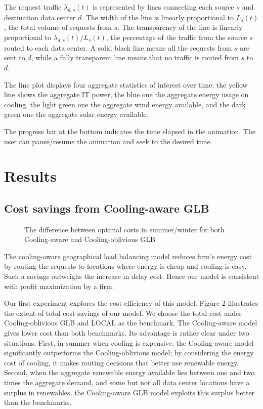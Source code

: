 \documentclass{acm_proc_article-sp}
\begin{document}
The request traffic $\lambda_{d,s}(t)$ is represented by lines connecting each source $s$ and destination data center $d$. The width of the line is linearly proportional to $L_s(t)$, the total volume of requests from $s$. The transparency of the line is linearly proportional to ${\lambda_{d,s}(t)} / {L_s(t)}$, the percentage of the traffic from the source $s$ routed to each data center. A solid black line means all the requests from $s$ are sent to $d$, while a fully transparent line means that no traffic is routed from $s$ to $d$.

The line plot displays four aggregate statistics of interest over time: the yellow line shows the aggregate IT power, the blue one the aggregate energy usage on cooling, the light green one the aggregate wind energy available, and the dark green one the aggregate solar energy available.

The progress bar at the bottom indicates the time elapsed in the animation. The user can pause/resume the animation and seek to the desired time.


\section{Results}
\subsection{Cost savings from Cooling-aware GLB}

\begin{figure}
\centering
{}
\caption{The difference between optimal costs in summer/winter for both Cooling-aware and Cooling-oblivious GLB}
\end{figure}

The cooling-aware geographical load balancing model reduces firm’s energy cost by routing the requests to locations where energy is cheap and cooling is easy. Such a savings outweighs the increase in delay cost. Hence our model is consistent with profit maximization by a firm.


Our first experiment explores the cost efficiency of this model. Figure 2 illustrates the extent of total cost savings of our model. We choose the total cost under Cooling-oblivious GLB and LOCAL as the benchmark. The Cooling-aware model gives lower cost than both benchmarks. Its advantage is rather clear under two situations. First, in summer when cooling is expensive, the Cooling-aware model significantly outperforms the Cooling-oblivious model; by considering the energy cost of cooling, it makes routing decisions that better use renewable energy. Second, when the aggregate renewable energy available lies between one and two times the aggregate demand, and some but not all data center locations have a surplus in renewables, the Cooling-aware GLB model exploits this surplus better than the benchmarks.
\end{document}
